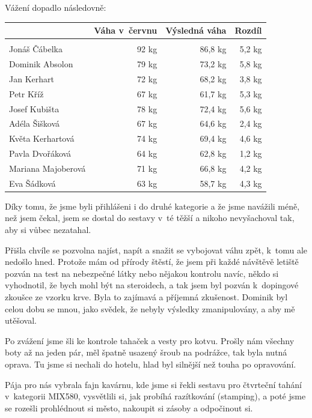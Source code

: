 \documentclass[11pt]{article}
\begin{document}
Vážení dopadlo následovně:

\vspace*{6pt}
\noindent
\begin{tabular*}{\linewidth}[]{lrrr}
  & Váha v~červnu & Výsledná váha & Rozdíl \\
  \hline \\
  Jonáš Čábelka & 92 kg & 86,8 kg & 5,2 kg \\
  Dominik Absolon & 79 kg & 73,2 kg & 5,8 kg \\
  Jan Kerhart & 72 kg & 68,2 kg & 3,8 kg \\
  Petr Kříž & 67 kg & 61,7 kg & 5,3 kg \\
  Josef Kubišta & 78 kg & 72,4 kg & 5,6 kg \\
  Adéla Šišková & 67 kg & 64,6 kg & 2,4 kg \\
  Květa Kerhartová & 74 kg & 69,4 kg & 4,6 kg \\
  Pavla Dvořáková & 64 kg & 62,8 kg & 1,2 kg \\
  Mariana Majoberová & 71 kg & 66,8 kg & 4,2 kg \\
  Eva Šádková & 63 kg & 58,7 kg & 4,3 kg \\
\end{tabular*}
\vspace*{6pt}

Díky tomu, že jsme byli přihlášeni i do druhé kategorie a že jsme navážili méně, než jsem čekal, jsem se dostal do sestavy v~té těžší a nikoho nevyšachoval tak, aby si vůbec nezatahal.

Přišla chvíle se pozvolna najíst, napít a snažit se vybojovat váhu zpět, k~tomu ale nedošlo hned. Protože mám od přírody štěstí, že jsem při každé návštěvě letiště pozván na test na nebezpečné látky nebo nějakou kontrolu navíc, někdo si vyhodnotil, že bych mohl být na steroidech, a tak jsem byl pozván k~dopingové zkoušce ze vzorku krve. Byla to zajímavá a příjemná zkušenost. Dominik byl celou dobu se mnou, jako svědek, že nebyly výsledky zmanipulovány, a aby mě utěšoval.

Po zvážení jsme šli ke kontrole tahaček a vesty pro kotvu. Prošly nám všechny boty až na jeden pár, měl špatně usazený šroub na podrážce, tak byla nutná oprava. Tu jsme si nechali do hotelu, hlad byl silnější než touha po opravování.

Pája pro nás vybrala fajn kavárnu, kde jsme si řekli sestavu pro čtvrteční tahání v~kategorii MIX580, vysvětlili si, jak probíhá razítkování (stamping), a poté jsme se rozešli prohlédnout si město, nakoupit si zásoby a odpočinout si.
\end{document}

